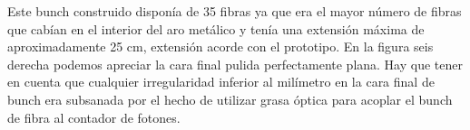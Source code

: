 Este bunch construido disponía de 35 fibras ya que era el mayor número de fibras que cabían en el interior del aro metálico y tenía una extensión máxima de aproximadamente 25 cm, extensión acorde con el prototipo. En la figura seis derecha podemos apreciar la cara final pulida perfectamente plana. Hay que tener en cuenta que cualquier irregularidad inferior al milímetro en la cara final de bunch era subsanada por el hecho de utilizar grasa óptica para acoplar el bunch de fibra al contador de fotones.
